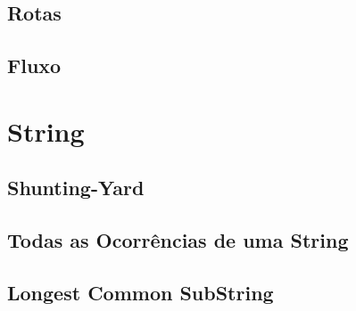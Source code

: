     \section{Rotas}
        
        
        
        
        
        \newpage
    \section{Fluxo}
\newpage

\chapter{String}
    \section{Shunting-Yard}
        
        \newpage
    \section{Todas as Ocorrências de uma String}
        
    \section{Longest Common SubString}
        
\newpage


% 

% 


